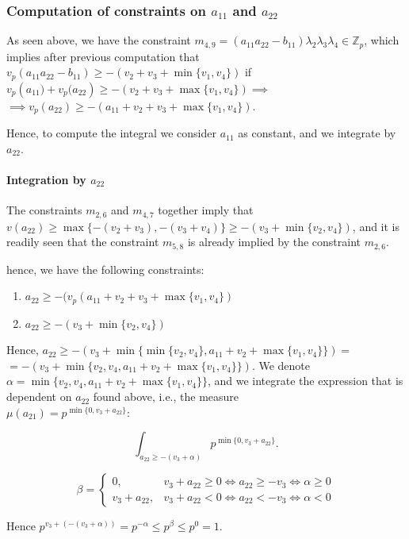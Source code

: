 \documentclass{article}
\begin{document}
\subsubsection{Computation of constraints on $a_{11}$ and $a_{22}$}
As seen above, we have the constraint 
$m_{4,9}=(a_{11}a_{22}-b_{11})\lambda_2\lambda_3\lambda_4\in\mathbb{Z}_p$, which implies after previous computation that \\
$v_p(a_{11}a_{22}-b_{11})\geq-(v_2+v_3+\min\{v_1,v_4\})$ if \\
$v_p({a_{11})+v_p(a_{22}})\geq-(v_2+v_3+\max\{v_1,v_4\})\implies$ \\
$\implies{v_p}(a_{22})\geq-(a_{11}+v_2+v_3+\max\{v_1,v_4\})$.

Hence, to compute the integral we consider $a_{11}$ as constant, and we integrate by $a_{22}$.
\paragraph{Integration by $a_{22}$}
The constraints $m_{2,6}$ and $m_{4,7}$ together imply that\\
$v(a_{22})\geq\max\{-(v_2+v_3),-(v_3+v_4)\}\geq-(v_3+\min\{v_2,v_4\})$, and it is readily seen that the constraint $m_{5,8}$ is already implied by the constraint $m_{2,6}$.

hence, we have the following constraints:
\begin{enumerate}
    \item $a_{22}\geq-(v_p(a_{11}+v_2+v_3+\max\{v_1,v_4\})$
    \item $a_{22}\geq-(v_3+\min\{v_2,v_4\})$
\end{enumerate}
Hence, $a_{22}\geq-(v_3+\min\{\min\{v_2,v_4\},a_{11}+v_2+\max\{v_1,v_4\}\})=$ \\
$=-(v_3+\min\{v_2,v_4,a_{11}+v_2+\max\{v_1,v_4\}\})$.
We denote $\alpha=\min\{v_2,v_4,a_{11}+v_2+\max\{v_1,v_4\}\}$, and we integrate the expression that is dependent on $a_{22}$ found above, i.e., the measure \\
$\mu(a_{21})=p^{\min\{0,v_3+a_{22}\}}$:

\[\int_{a_{22}\geq-(v_3+\alpha)}p^{\min\{0,v_3+a_{22}\}}.\]

\[
\beta=\begin{cases}
    0,&v_3+a_{22}\geq{0}\iff{a_{22}}\geq{-v_3}\iff\alpha\geq{0}\\
    v_3+a_{22},&v_3+a_{22}<{0}\iff{a_{22}}<{-v_3}\iff\alpha<{0}
\end{cases}
\]

Hence $p^{v_3+(-(v_3+\alpha))}=p^{-\alpha}\leq{p}^{\beta}\leq{p}^0=1$.
\end{document}
